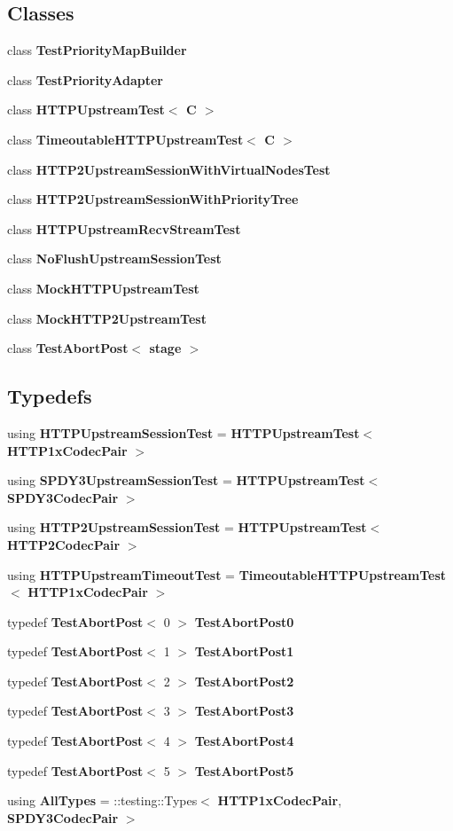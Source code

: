 \subsection*{Classes}
\begin{DoxyCompactItemize}
\item 
class {\bf Test\+Priority\+Map\+Builder}
\item 
class {\bf Test\+Priority\+Adapter}
\item 
class {\bf H\+T\+T\+P\+Upstream\+Test$<$ C $>$}
\item 
class {\bf Timeoutable\+H\+T\+T\+P\+Upstream\+Test$<$ C $>$}
\item 
class {\bf H\+T\+T\+P2\+Upstream\+Session\+With\+Virtual\+Nodes\+Test}
\item 
class {\bf H\+T\+T\+P2\+Upstream\+Session\+With\+Priority\+Tree}
\item 
class {\bf H\+T\+T\+P\+Upstream\+Recv\+Stream\+Test}
\item 
class {\bf No\+Flush\+Upstream\+Session\+Test}
\item 
class {\bf Mock\+H\+T\+T\+P\+Upstream\+Test}
\item 
class {\bf Mock\+H\+T\+T\+P2\+Upstream\+Test}
\item 
class {\bf Test\+Abort\+Post$<$ stage $>$}
\end{DoxyCompactItemize}
\subsection*{Typedefs}
\begin{DoxyCompactItemize}
\item 
using {\bf H\+T\+T\+P\+Upstream\+Session\+Test} = {\bf H\+T\+T\+P\+Upstream\+Test}$<$ {\bf H\+T\+T\+P1x\+Codec\+Pair} $>$
\item 
using {\bf S\+P\+D\+Y3\+Upstream\+Session\+Test} = {\bf H\+T\+T\+P\+Upstream\+Test}$<$ {\bf S\+P\+D\+Y3\+Codec\+Pair} $>$
\item 
using {\bf H\+T\+T\+P2\+Upstream\+Session\+Test} = {\bf H\+T\+T\+P\+Upstream\+Test}$<$ {\bf H\+T\+T\+P2\+Codec\+Pair} $>$
\item 
using {\bf H\+T\+T\+P\+Upstream\+Timeout\+Test} = {\bf Timeoutable\+H\+T\+T\+P\+Upstream\+Test}$<$ {\bf H\+T\+T\+P1x\+Codec\+Pair} $>$
\item 
typedef {\bf Test\+Abort\+Post}$<$ 0 $>$ {\bf Test\+Abort\+Post0}
\item 
typedef {\bf Test\+Abort\+Post}$<$ 1 $>$ {\bf Test\+Abort\+Post1}
\item 
typedef {\bf Test\+Abort\+Post}$<$ 2 $>$ {\bf Test\+Abort\+Post2}
\item 
typedef {\bf Test\+Abort\+Post}$<$ 3 $>$ {\bf Test\+Abort\+Post3}
\item 
typedef {\bf Test\+Abort\+Post}$<$ 4 $>$ {\bf Test\+Abort\+Post4}
\item 
typedef {\bf Test\+Abort\+Post}$<$ 5 $>$ {\bf Test\+Abort\+Post5}
\item 
using {\bf All\+Types} = \+::testing\+::\+Types$<$ {\bf H\+T\+T\+P1x\+Codec\+Pair}, {\bf S\+P\+D\+Y3\+Codec\+Pair} $>$
\end{DoxyCompactItemize}

